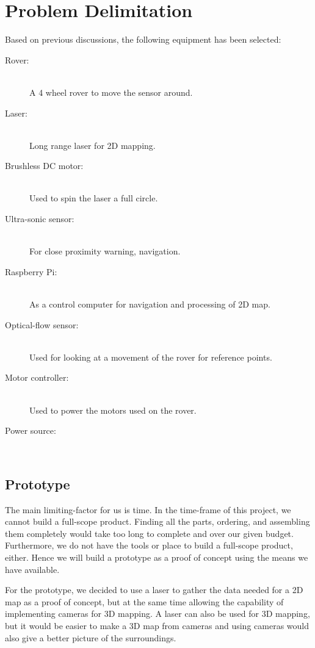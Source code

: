 \section{Problem Delimitation}
Based on previous discussions, the following equipment has been selected:

\begin{description}
  \item[Rover:] \hfill \\
  A 4 wheel rover to move the sensor around.
  \item[Laser:] \hfill \\
  Long range laser for 2D mapping.
  \item[Brushless DC motor:] \hfill \\
  Used to spin the laser a full circle.
  \item[Ultra-sonic sensor:] \hfill \\
  For close proximity warning, navigation.
  \item[Raspberry Pi:] \hfill \\
  As a control computer for navigation and processing of 2D map.
  \item[Optical-flow sensor:] \hfill \\
  Used for looking at a movement of the rover for reference points.
  \item[Motor controller:] \hfill \\
  Used to power the motors used on the rover.
  \item[Power source:] \hfill \\
\end{description}

\subsection{Prototype}%
The main limiting-factor for us is time. In the time-frame of this project, we cannot build a full-scope product. Finding all the parts, ordering, and assembling them completely would take too long to complete and over our given budget. Furthermore, we do not have the tools or place to build a full-scope product, either. Hence we will build a prototype as a proof of concept using the means we have available.

For the prototype, we decided to use a laser to gather the data needed for a 2D map as a proof of concept, but at the same time allowing the capability of implementing cameras for 3D mapping. A laser can also be used for 3D mapping, but it would be easier to make a 3D map from cameras and using cameras would also give a better picture of the surroundings.

